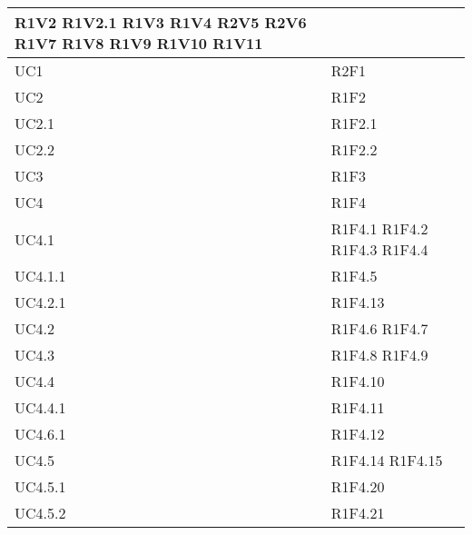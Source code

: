 \begin{center}
\begin{longtable}{|p{44mm}|p{22mm}|}
	R1V2 \newline
	R1V2.1\newline
	R1V3  \newline
	R1V4  \newline
	R2V5  \newline
	R2V6  \newline
	R1V7  \newline
	R1V8  \newline
	R1V9  \newline
	R1V10  \newline
	R1V11
\\
\hline
UC1 & R2F1  \\
\hline
UC2 & R1F2  \\
\hline
UC2.1 & R1F2.1  \\
\hline
UC2.2 & R1F2.2  \\
\hline
UC3 & R1F3  \\
\hline
UC4& R1F4 \\
\hline
UC4.1& 
	R1F4.1  \newline
	R1F4.2 \newline
	R1F4.3 \newline
	R1F4.4 
 \\
\hline
UC4.1.1& R1F4.5 \\
\hline
UC4.2.1& R1F4.13\\
\hline
UC4.2& 
	R1F4.6  \newline
	R1F4.7 
   \\
\hline
UC4.3& 
	R1F4.8  \newline
	R1F4.9 
   \\
\hline
UC4.4& R1F4.10\\
\hline
UC4.4.1& R1F4.11 \\
\hline
UC4.6.1& R1F4.12 \\
\hline

UC4.5&  
R1F4.14  \newline
R1F4.15  	
  \\ \hline
UC4.5.1 & R1F4.20  \\
\hline
UC4.5.2 & R1F4.21 \\
\hline


\end{longtable}
\end{center}
